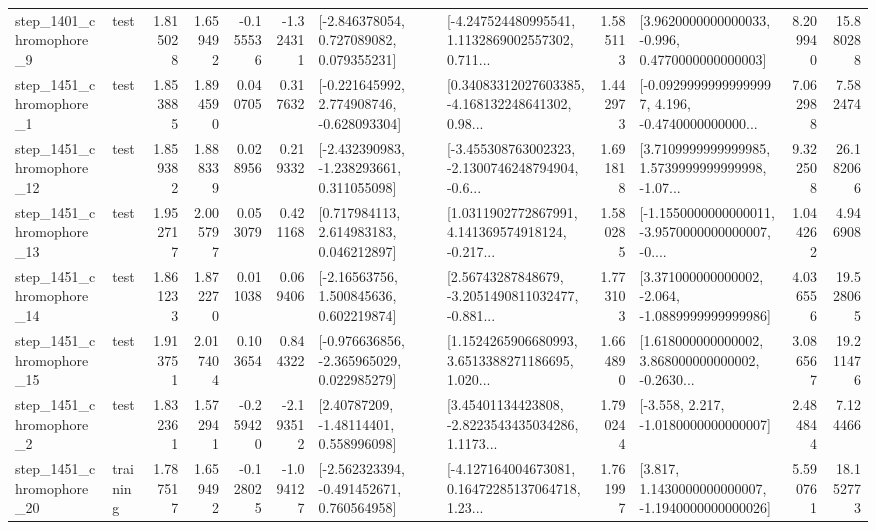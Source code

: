 \begin{tabular}{llrrrrllrlrr}
  step\_1401\_chromophore\_9 &      test &      1.815028 &    1.659492 &     -0.155536 & -1.324311 &    [-2.846378054, 0.727089082, 0.079355231] &  [-4.247524480995541, 1.1132869002557302, 0.711... &       1.585113 &   [3.9620000000000033, -0.996, 0.4770000000000003] &            8.209940 &         15.880288 \\
  step\_1451\_chromophore\_1 &      test &      1.853885 &    1.894590 &      0.040705 &  0.317632 &   [-0.221645992, 2.774908746, -0.628093304] &  [0.34083312027603385, -4.168132248641302, 0.98... &       1.442973 &  [-0.09299999999999997, 4.196, -0.4740000000000... &            7.062988 &          7.582474 \\
 step\_1451\_chromophore\_12 &      test &      1.859382 &    1.888339 &      0.028956 &  0.219332 &   [-2.432390983, -1.238293661, 0.311055098] &  [-3.455308763002323, -2.1300746248794904, -0.6... &       1.691818 &  [3.7109999999999985, 1.5739999999999998, -1.07... &            9.322508 &         26.182066 \\
 step\_1451\_chromophore\_13 &      test &      1.952717 &    2.005797 &      0.053079 &  0.421168 &     [0.717984113, 2.614983183, 0.046212897] &  [1.0311902772867991, 4.141369574918124, -0.217... &       1.580285 &  [-1.1550000000000011, -3.9570000000000007, -0.... &            1.044262 &          4.946908 \\
 step\_1451\_chromophore\_14 &      test &      1.861233 &    1.872270 &      0.011038 &  0.069406 &     [-2.16563756, 1.500845636, 0.602219874] &  [2.56743287848679, -3.2051490811032477, -0.881... &       1.773103 &   [3.371000000000002, -2.064, -1.0889999999999986] &            4.036556 &         19.528065 \\
 step\_1451\_chromophore\_15 &      test &      1.913751 &    2.017404 &      0.103654 &  0.844322 &   [-0.976636856, -2.365965029, 0.022985279] &  [1.1524265906680993, 3.6513388271186695, 1.020... &       1.664890 &  [1.618000000000002, 3.868000000000002, -0.2630... &            3.086567 &         19.211476 \\
  step\_1451\_chromophore\_2 &      test &      1.832361 &    1.572941 &     -0.259420 & -2.193512 &      [2.40787209, -1.48114401, 0.558996098] &  [3.45401134423808, -2.8223543435034286, 1.1173... &       1.790244 &               [-3.558, 2.217, -1.0180000000000007] &            2.484844 &          7.124466 \\
 step\_1451\_chromophore\_20 &  training &      1.787517 &    1.659492 &     -0.128025 & -1.094127 &   [-2.562323394, -0.491452671, 0.760564958] &  [-4.127164004673081, 0.16472285137064718, 1.23... &       1.761997 &   [3.817, 1.1430000000000007, -1.1940000000000026] &            5.590761 &         18.152773 \\

\end{tabular}
